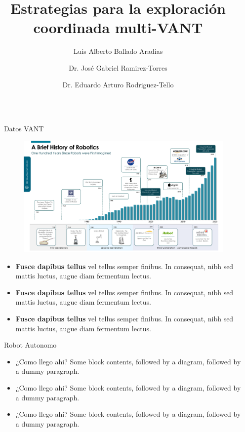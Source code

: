 \documentclass[final]{beamer}
\title{Estrategias para la exploración coordinada multi-VANT}
\author{Luis Alberto Ballado Aradias \and Dr. José Gabriel Ramirez-Torres \and Dr. Eduardo Arturo Rodriguez-Tello}
\institute[shortinst]{CINVESTAV - UNIDAD TAMAULIPAS}
\newlength{\sepwidth}
\newlength{\colwidth}
\newcommand{\separatorcolumn}{\begin{column}{\sepwidth}\end{column}}
\begin{document}
\begin{frame}[t]
\begin{columns}[t]
\separatorcolumn

\begin{column}{\colwidth}
  
  \begin{alertblock}{Datos VANT}
    \begin{figure}[t]
      \includegraphics[width=35cm]{images/datos.png}
      \centering
    \end{figure}
    \begin{multicols}{3}
      \begin{itemize}
      \item \textbf{Fusce dapibus tellus} vel tellus semper finibus. In consequat, nibh sed mattis luctus, augue diam fermentum lectus.\cite{shannon1948communication}\\
      \item \textbf{Fusce dapibus tellus} vel tellus semper finibus. In consequat, nibh sed mattis luctus, augue diam fermentum lectus.\cite{otromas}\\
      \item \textbf{Fusce dapibus tellus} vel tellus semper finibus. In consequat, nibh sed mattis luctus, augue diam fermentum lectus.\cite{unomas}\\
      \end{itemize}
    \end{multicols}
  \end{alertblock}
  
  \begin{block}{Robot Autonomo}
    \begin{multicols}{2}
      \begin{itemize}
      \item ¿Como llego ahi?
        Some block contents, followed by a diagram, followed by a dummy paragraph.
      \item ¿Como llego ahi?
        Some block contents, followed by a diagram, followed by a dummy paragraph.
      \item ¿Como llego ahi?
        Some block contents, followed by a diagram, followed by a dummy paragraph.
      \end{itemize}
      

\end{multicols}
\end{block}
\end{column}
\end{columns}
\end{frame}
\end{document}
